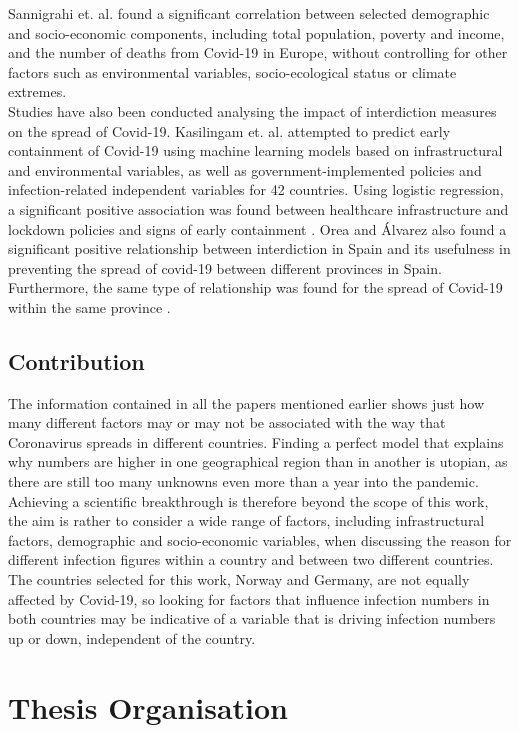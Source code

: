Sannigrahi et. al. found a significant correlation between selected demographic and socio-economic components, including total population, poverty and income, and the number of deaths from Covid-19 in Europe, without controlling for other factors such as environmental variables, socio-ecological status or climate extremes\autocite[][]{sannigrahi2020examining}. \\
Studies have also been conducted analysing the impact of interdiction measures on the spread of Covid-19. Kasilingam et. al. attempted to predict early containment of Covid-19 using machine learning models based on infrastructural and environmental variables, as well as government-implemented policies and infection-related independent variables for 42 countries. Using logistic regression, a significant positive association was found between healthcare infrastructure and lockdown policies and signs of early containment \autocite[][]{kasilingam2020exploring}.
Orea and Álvarez also found a significant positive relationship between interdiction in Spain and its usefulness in preventing the spread of covid-19 between different provinces in Spain. Furthermore, the same type of relationship was found for the spread of Covid-19 within the same province \autocite[][]{orea2020effective}. \\
\subsection*{Contribution}
The information contained in all the papers mentioned earlier shows just how many different factors may or may not be associated with the way that Coronavirus spreads in different countries. Finding a perfect model that explains why numbers are higher in one geographical region than in another is utopian, as there are still too many unknowns even more than a year into the pandemic. Achieving a scientific breakthrough is therefore beyond the scope of this work, the aim is rather to consider a wide range of factors, including infrastructural factors, demographic and socio-economic variables, when discussing the reason for different infection figures within a country and between two different countries. The countries selected for this work, Norway and Germany, are not equally affected by Covid-19, so looking for factors that influence infection numbers in both countries may be indicative of a variable that is driving infection numbers up or down, independent of the country.
\clearpage
\section{Thesis Organisation}



